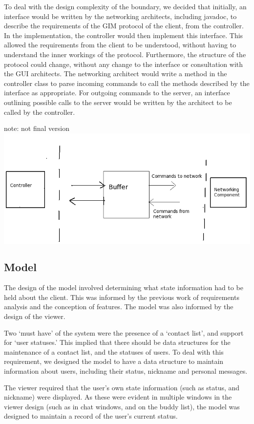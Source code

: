To deal with the design complexity of the boundary, we decided that initially, an interface would be written by the networking architects, including javadoc, to describe the requirements of the GIM protocol of the client, from the controller. In the implementation, the controller would then implement this interface. This allowed the requirements from the client to be understood, without having to understand the inner workings of the protocol. Furthermore, the structure of the protocol could change, without any change to the interface or consultation with the GUI architects. The networking architect would write a method in the controller class to parse incoming commands to call the methods described by the interface as appropriate. For outgoing commands to the server, an interface outlining possible calls to the server would be written by the architect to be called by the controller. 

note: not final version
\includegraphics[scale=0.65]{chapter2/diagrams/buffer.png}

\subsection {Model}

The design of the model involved determining what state information had to be held about the client. This was informed by the previous work of requirements analysis and the conception of features. The model was also informed by the design of the viewer.

Two ‘must have’ of the system were the presence of a ‘contact list’, and support for ‘user statuses.’ This implied that there should be data structures for the maintenance of a contact list, and the statuses of users. To deal with this requirement, we designed the model to have a data structure to maintain information about users, including their status, nickname and personal messages. 

The viewer required that the user’s own state information (such as status, and nickname) were displayed. As these were evident in multiple windows in the viewer design (such as in chat windows, and on the buddy list), the model was designed to maintain a record of the user’s current status. 

